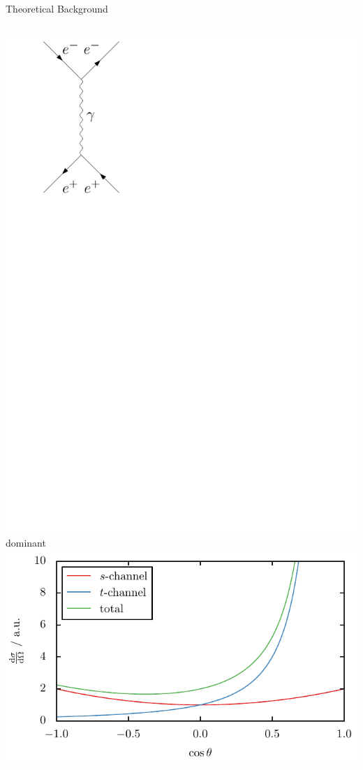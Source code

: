 \documentclass[11pt,xcolor=dvipsnames,professionalfonts]{beamer}
\begin{document}
\begin{frame}{Theoretical Background}
\begin{columns}
		\includegraphics[width=.8\textwidth]{./figures/theory/feynman/t_gamma}\\
		\footnotesize{dominant}
		\centering
		\vspace{3pt}
		\includegraphics[width=\textwidth]{./talkfigs/pdf/s_t_channel}
	\end{columns}
\end{frame}
\end{document}
